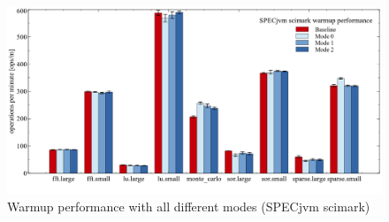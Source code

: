 \begin{figure}[ht!]
  \begin{center}
    \centering
    \includegraphics[width=1.0\textwidth]{figures/scimark_warmup.png}
    \caption{Warmup performance with all different modes (SPECjvm scimark)}
    \label{f:scimark_warmup}
  \end{center}
\end{figure}

